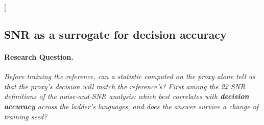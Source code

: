 \clearpage
\twocolumn[{%
\subsection{SNR as a surrogate for decision accuracy}
\label{app:rq04_surrogates}

\noindent\begin{minipage}[t]{0.485\textwidth}
\vspace{0pt}
\paragraph{Research Question.} \emph{Before training the reference, can a statistic computed on the proxy alone tell us that the proxy's decision will match the reference's? First among the 22 SNR definitions of the noise-and-SNR analysis: which best correlates with \textbf{decision accuracy} across the ladder's languages, and does the answer survive a change of training seed?}


\end{minipage}}
